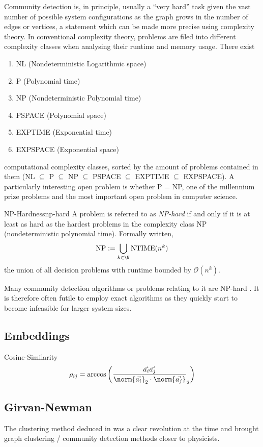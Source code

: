 \documentclass[12pt, a4paper]{article}
\begin{document}
  Community detection is, in principle, usually a ``very hard'' task given the vast number of possible system configurations as the graph grows in the number of edges or vertices, a statement which can be made more precise using complexity theory.
  In conventional complexity theory, problems are filed into different complexity classes when analysing their runtime and memory usage.
  There exist
  \begin{enumerate}[noitemsep,topsep=0pt,parsep=0pt,partopsep=0pt]
    \item NL (Nondeterministic Logarithmic space)
    \item P (Polynomial time)
    \item NP (Nondeterministic Polynomial time)
    \item PSPACE (Polynomial space)
    \item EXPTIME (Exponential time)
    \item EXPSPACE (Exponential space)
  \end{enumerate}
  computational complexity classes, sorted by the amount of problems contained in them (NL $\subseteq$ P $\subseteq$ NP $\subseteq$ PSPACE $\subseteq$ EXPTIME $\subseteq$ EXPSPACE).
  A particularly interesting open problem is whether P = NP, one of the millennium prize problems and the most important open problem in computer science.

  \begin{definition}{NP-Hardness}{np-hard}
    A problem is referred to as \textit{NP-hard} if and only if it is at least as hard as the hardest problems in the complexity class NP (nondeterministic polynomial time). Formally written,
    $$\mathrm{NP} := \bigcup_{k \in \N} \mathrm{NTIME}(n^k)$$
    the union of all decision problems with runtime bounded by $\mathcal{O}(n^k)$.
  \end{definition}

  Many community detection algorithms or problems relating to it are NP-hard \parencite{fortunato}.
  It is therefore often futile to employ exact algorithms as they quickly start to become infeasible for larger system sizes.

  \subsection{Embeddings}
  Cosine-Similarity
  $$\rho_{ij} = \arccos\left(\frac{\vec{a_i} \vec{a_j}}{\norm{\vec{a_i}}_2 \cdot \norm{\vec{a_j}}}_2\right)$$

  \subsection{Girvan-Newman}
  The clustering method deduced in \cite{girvan-newman} was a clear revolution at the time and brought graph clustering / community detection methods closer to physicists.
\end{document}
